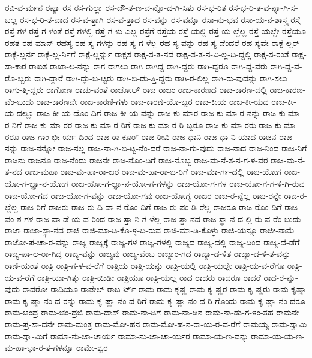 {ರವಿ-ವ-ರ್ಮನ
ರಷ್ಯಾ
ರಸ
ರಸ-ಗುಲ್ಲಾ
ರಸ-ದೌ-ತ-ಣ-ವ-ನ್ನೊ-ದ-ಗಿ-ಸಿತು
ರಸ-ಭ-ರಿತ
ರಸ-ಭ-ರಿ-ತ-ವ-ನ್ನಾ-ಗಿ-ಸ-ಬಲ್ಲ
ರಸ-ಭ-ರಿ-ತ-ವಾದ
ರಸ-ವ-ತ್ತಾಗಿ
ರಸ-ವ-ತ್ತಾದ
ರಸ-ವನ್ನು
ರಸ-ವನ್ನೂ
ರಸಾ-ನು-ಭವ
ರಸಾ-ಯ-ನ-ಶಾಸ್ತ್ರ
ರಸ್ತೆ
ರಸ್ತೆ-ಗಳ
ರಸ್ತೆ-ಗ-ಳಂತೆ
ರಸ್ತೆ-ಗಳಲ್ಲಿ
ರಸ್ತೆ-ಗ-ಳು-ಎಲ್ಲ
ರಸ್ತೆಗೆ
ರಸ್ತೆಯ
ರಸ್ತೆ-ಯಲ್ಲಿ
ರಸ್ತೆ-ಯ-ಲ್ಲೆಲ್ಲ
ರಸ್ತೆ-ಯಲ್ಲೇ
ರಸ್ತೆಯೂ
ರಹತ
ರಹ-ಮಾನ್
ರಹಸ್ಯ
ರಹ-ಸ್ಯ-ಗಳನ್ನು
ರಹ-ಸ್ಯ-ಗ-ಳೆಲ್ಲ
ರಹ-ಸ್ಯ-ವನ್ನು
ರಹ-ಸ್ಯ-ವೆಂದರೆ
ರಹ-ಸ್ಯವೇ
ರಾಕ್ಫೆ-ಲ್ಲರ್
ರಾಕ್ಫೆ-ಲ್ಲರ್ನ
ರಾಕ್ಫೆ-ಲ್ಲ-ರ್ನಿಗೆ
ರಾಕ್ಫೆ-ಲ್ಲರ್ನ್ನು
ರಾಕ್ಷಸ
ರಾಕ್ಷ-ಸ-ತ-ನದ
ರಾಕ್ಷ-ಸ-ತ-ನ-ವಿ-ಲ್ಲ-ದಿ-ದ್ದಲ್ಲಿ
ರಾಕ್ಷ-ಸ-ರಂತೆ
ರಾಕ್ಷ-ಸಾ-ಕಾರ
ರಾಖತ
ರಾಖಾ-ಲ-ನನ್ನು
ರಾಗ
ರಾಗಲು
ರಾಗಿ
ರಾಗಿದ್ದ
ರಾಗಿ-ದ್ದರು
ರಾಗಿ-ದ್ದರೂ
ರಾಗಿ-ದ್ದ-ವರು
ರಾಗಿ-ದ್ದ-ವ-ರೊ-ಬ್ಬರು
ರಾಗಿ-ದ್ದಾರೆ
ರಾಗಿ-ದ್ದು-ಬಿ-ಟ್ಟರು
ರಾಗಿ-ಬಿ-ಡು-ತ್ತಿ-ದ್ದರು
ರಾಗಿ-ರ-ಲಿಲ್ಲ
ರಾಗಿ-ರು-ವುದನ್ನು
ರಾಗಿ-ಸಲು
ರಾಗು-ತ್ತಿ-ದ್ದರು
ರಾಗೋಣ
ರಾಚು-ವಂತೆ
ರಾಚೋಲ್
ರಾಜ
ರಾಜಂ
ರಾಜ-ಕಾರಣದ
ರಾಜ-ಕಾರಣ-ದಲ್ಲಿ
ರಾಜ-ಕಾರಣ-ವೆಂ-ಬುದು
ರಾಜ-ಕಾರಣವೇ
ರಾಜ-ಕಾರಣಿ-ಗಳು
ರಾಜ-ಕಾರಣಿ-ಯೊ-ಬ್ಬರ
ರಾಜ-ಕೀಯ
ರಾಜ-ಕೀ-ಯದ
ರಾಜ-ಕೀ-ಯ-ದಲ್ಲೂ
ರಾಜ-ಕೀ-ಯ-ದೊಂ-ದಿಗೆ
ರಾಜ-ಕೀ-ಯ-ವನ್ನು
ರಾಜ-ಕು-ಮಾರ
ರಾಜ-ಕು-ಮಾ-ರ-ನನ್ನು
ರಾಜ-ಕು-ಮಾ-ರ-ನಿಗೆ
ರಾಜ-ಕು-ಮಾ-ರರ
ರಾಜ-ಕು-ಮಾ-ರ-ರಿಗೆ
ರಾಜ-ಕು-ಮಾ-ರ-ರಿ-ಬ್ಬರೂ
ರಾಜ-ಕು-ಮಾ-ರರು
ರಾಜ-ಕು-ಮಾ-ರರೂ
ರಾಜ-ಗಾಂ-ಭೀ-ರ್ಯ-ದಿಂದ
ರಾಜ-ಠಾ-ಕೂರ್
ರಾಜ-ಠೀವಿ
ರಾಜ-ಧಾನಿ
ರಾಜ-ಧಾ-ನಿ-ಯಾದ
ರಾಜನ
ರಾಜ-ನನ್ನು
ರಾಜ-ನನ್ನೋ
ರಾಜ-ನಲ್ಲ
ರಾಜ-ನಾ-ಗಿ-ಬಿ-ಟ್ಟ-ನೆಂ-ದರೆ
ರಾಜ-ನಾ-ಗು-ವುದು
ರಾಜ-ನಾದ
ರಾಜ-ನಿಂದ
ರಾಜ-ನಿಗೆ
ರಾಜನು
ರಾಜನೂ
ರಾಜ-ನೆಂದು
ರಾಜನೇ
ರಾಜ-ನೊಂ-ದಿಗೆ
ರಾಜ-ನೊಬ್ಬ
ರಾಜ-ಮ-ನೆ-ತ-ನ-ಗ-ಳ-ವರ
ರಾಜ-ಮ-ನೆ-ತ-ನದ
ರಾಜ-ಮಹಾ
ರಾಜ-ಮ-ಹಾ-ರಾ-ಜರ
ರಾಜ-ಮ-ಹಾ-ರಾ-ಜ-ರಿಗೆ
ರಾಜ-ಮಾ-ರ್ಗ-ದಲ್ಲಿ
ರಾಜ-ಯೋಗ
ರಾಜ-ಯೋ-ಗ-ಜ್ಞಾ-ನ-ಯೋಗ
ರಾಜ-ಯೋ-ಗ-ಜ್ಞಾ-ನ-ಯೋ-ಗ-ಗಳನ್ನು
ರಾಜ-ಯೋ-ಗ-ಗಳ
ರಾಜ-ಯೋ-ಗ-ಗ-ಳಿ-ಗಿ-ರುವ
ರಾಜ-ಯೋ-ಗದ
ರಾಜ-ಯೋ-ಗ-ವನ್ನು
ರಾಜ-ಯೋ-ಗವು
ರಾಜ-ಯೋಗ್ಯ
ರಾಜರ
ರಾಜ-ರ-ನ್ನೆಲ್ಲ
ರಾಜ-ರನ್ನೇ
ರಾಜ-ರ-ಲ್ಲೆಲ್ಲ
ರಾಜ-ರಿಗೆ
ರಾಜರು
ರಾಜ-ರು-ದಿ-ವಾ-ನ-ರೊಂ-ದಿಗೆ
ರಾಜ-ರು-ಪಂ-ಡಿ-ರೆಲ್ಲ
ರಾಜರೂ
ರಾಜ-ರೊಂ-ದಿಗೆ
ರಾಜ-ವಂ-ಶ-ಗಳ
ರಾಜ-ವಾ-ಡೆ-ಯ-ವ-ರಿಂದ
ರಾಜ-ಸ್ತಾ-ನಿ-ಗ-ಳೆಲ್ಲ
ರಾಜ-ಸ್ಥಾ-ನದ
ರಾಜ-ಸ್ಥಾ-ನ-ದ-ಲ್ಲಿ-ರು-ವ-ರೆಂ-ಬುದು
ರಾಜಾ
ರಾಜಾ-ಸ್ಥಾ-ನದ
ರಾಜಿ
ರಾಜಿ-ಮಾ-ಡಿ-ಕೊ-ಳ್ಳ-ದಿ-ರುವ
ರಾಜಿ-ಮಾ-ಡಿ-ಕೊಳ್ಳು
ರಾಜಿ-ಯನ್ನೂ
ರಾಜೀ-ನಾಮೆ
ರಾಜೋ-ಪ-ಚಾ-ರ-ವನ್ನು
ರಾಜ್ಯ
ರಾಜ್ಯಕ್ಕೆ
ರಾಜ್ಯ-ಗಳ
ರಾಜ್ಯ-ಗಳಲ್ಲಿ
ರಾಜ್ಯದ
ರಾಜ್ಯ-ದಲ್ಲಿ
ರಾಜ್ಯ-ದಿಂದ
ರಾಜ್ಯ-ದೆ-ಡೆಗೆ
ರಾಜ್ಯ-ಪಾ-ಲ-ರಾ-ಗಿದ್ದ
ರಾಜ್ಯ-ವನ್ನು
ರಾಜ್ಯವು
ರಾಜ್ಯ-ವೆಂಬ
ರಾಜ್ಯಾಂ-ಗದ
ರಾಜ್ಯಾ-ಡ-ಳಿತ
ರಾಜ್ಯಾ-ಡ-ಳಿ-ತ-ವನ್ನು
ರಾಣಿ-ಯಂತೆ
ರಾತ್ರಿ
ರಾತ್ರಿ-ಗ-ಳ-ವ-ರೆಗೆ
ರಾತ್ರಿಯ
ರಾತ್ರಿ-ಯನ್ನು
ರಾತ್ರಿ-ಯಲ್ಲಿ
ರಾತ್ರಿ-ಯಲ್ಲೇ
ರಾತ್ರಿ-ಯ-ವ-ರೆಗೂ
ರಾತ್ರಿ-ಯ-ವ-ರೆಗೆ
ರಾತ್ರಿ-ಯಾ-ಗಿತ್ತು
ರಾತ್ರಿ-ಯಿಡೀ
ರಾತ್ರಿಯೂ
ರಾತ್ರಿ-ಯೆಲ್ಲ
ರಾದ
ರಾದರು
ರಾದರೂ
ರಾದರೆ
ರಾದ-ರೆ-ನ್ನು-ವುದು
ರಾದರೋ
ರಾಧಿಯೂ
ರಾಫೇಲ್
ರಾಬ-ರ್ಟ್
ರಾಮ
ರಾಮ-ಕೃಷ್ಣ
ರಾಮ-ಕೃ-ಷ್ಣರ
ರಾಮ-ಕೃ-ಷ್ಣರು
ರಾಮ-ಕೃಷ್ಣಾ
ರಾಮ-ಕೃ-ಷ್ಣಾ-ನಂ-ದ-ರನ್ನು
ರಾಮ-ಕೃ-ಷ್ಣಾ-ನಂ-ದ-ರಿಗೆ
ರಾಮ-ಕೃ-ಷ್ಣಾ-ನಂ-ದ-ರಿ-ಗೊಂದು
ರಾಮ-ಕೃ-ಷ್ಣಾ-ನಂ-ದರೂ
ರಾಮ-ಚಂದ್ರ
ರಾಮ-ಚಂ-ದ್ರಜಿ
ರಾಮ-ದಾಸ್
ರಾಮ-ನಾ-ಡಿಗೆ
ರಾಮ-ನಾ-ಡಿನ
ರಾಮ-ನಾ-ಡು-ಗ-ಳಂ-ತಹ
ರಾಮನೇ
ರಾಮ-ಪ್ರ-ಸಾ-ದನೇ
ರಾಮ-ಮಂತ್ರ
ರಾಮ-ಮೋ-ಹನ
ರಾಮ-ಮೋ-ಹ-ನ-ರಾ-ಯ-ರ-ವ-ರೆಗೆ
ರಾಮಯ್ಯ
ರಾಮ-ಸ್ವಾಮಿ
ರಾಮ-ಸ್ವಾ-ಮಿಗೆ
ರಾಮಾ-ನು-ಜಾ-ಚಾರ್ಯ
ರಾಮಾ-ನು-ಜಾ-ಚಾ-ರ್ಯರ
ರಾಮಾ-ಯ-ಣ-ವನ್ನು
ರಾಮಾ-ಯ-ಯ-ಣ-ಮ-ಹಾ-ಭಾ-ರ-ತ-ಗಳನ್ನೂ
ರಾಮೇ-ಶ್ವರ
}
